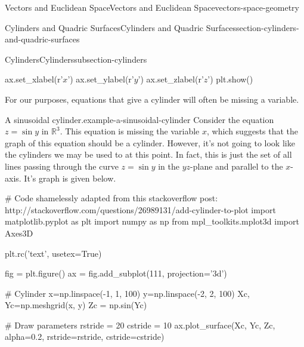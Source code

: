 \documentclass[oneside,10pt,]{book}
\numberwithin{equation}{section}
\newcommand{\RR}{\mathbb{R}}
\begin{document}
\begin{chapterptx}{Vectors and Euclidean Space}{}{Vectors and Euclidean Space}{}{}{vectors-space-geometry}
\begin{sectionptx}{Cylinders and Quadric Surfaces}{}{Cylinders and Quadric Surfaces}{}{}{section-cylinders-and-quadric-surfaces}
\begin{subsectionptx}{Cylinders}{}{Cylinders}{}{}{subsection-cylinders}
\begin{sageinput}
ax.set_xlabel(r'$x$')
ax.set_ylabel(r'$y$')
ax.set_zlabel(r'$z$')
plt.show()
\end{sageinput}
\hypertarget{p-1237}{}%
For our purposes, equations that give a cylinder will often be missing a variable.%
\begin{example}{A sinusoidal cylinder.}{example-a-sinusoidal-cylinder}%
\hypertarget{p-1238}{}%
Consider the equation \(z = \sin y\) in \(\RR^{3}\). This equation is missing the variable \(x\), which suggests that the graph of this equation should be a cylinder. However, it's not going to look like the cylinders we may be used to at this point. In fact, this is just the set of all lines passing through the curve \(z=\sin y\) in the \(yz\)-plane and parallel to the \(x\)-axis. It's graph is given below.%
\end{example}
\begin{sageinput}
# Code shamelessly adapted from this stackoverflow post: http://stackoverflow.com/questions/26989131/add-cylinder-to-plot
import matplotlib.pyplot as plt
import numpy as np
from mpl_toolkits.mplot3d import Axes3D

plt.rc('text', usetex=True)

fig = plt.figure()
ax = fig.add_subplot(111, projection='3d')

# Cylinder
x=np.linspace(-1, 1, 100)
y=np.linspace(-2, 2, 100)
Xc, Yc=np.meshgrid(x, y)
Zc = np.sin(Yc)

# Draw parameters
rstride = 20
cstride = 10
ax.plot_surface(Xc, Yc, Zc, alpha=0.2, rstride=rstride, cstride=cstride)


\end{sageinput}
\end{subsectionptx}
\end{sectionptx}
\end{chapterptx}
\end{document}
